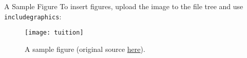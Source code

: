 \documentclass[10pt,xcolor={table,dvipsnames},t,unknownkeysallowed]{beamer}
\begin{document}
\begin{frame}{A Sample Figure}
To insert figures, upload the image to the file tree and use \texttt{includegraphics}:
\newline
\begin{figure}
\texttt{[image: tuition]}
\caption{\label{fig:figure}A sample figure (original source \href{https://management.charlotte.edu/admissions/financial-information}{here}).}
\end{figure}
\end{frame}
\end{document}
